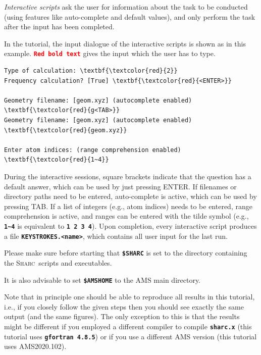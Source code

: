 \documentclass[a4paper,11pt,DIV=15,openany]{scrbook}
\newcommand{\sharc}{\textsc{Sharc}}
\newcommand{\ttt}[1]{\textbf{\texttt{#1}}}
\begin{document}
\emph{Interactive scripts} ask the user for information about the task to be conducted (using features like auto-complete and default values), and only perform the task after the input has been completed. 

In the tutorial, the input dialogue of the interactive scripts is shown as in this example. 
\texttt{\textbf{\textcolor{red}{Red bold text}}} gives the input which the user has to type. 
\begin{oframed}
\footnotesize\begin{Verbatim}[commandchars=\\\{\}]
Type of calculation: \textbf{\textcolor{red}{2}}
Frequency calculation? [True] \textbf{\textcolor{red}{<ENTER>}}

Geometry filename: [geom.xyz] (autocomplete enabled) \textbf{\textcolor{red}{g<TAB>}}
Geometry filename: [geom.xyz] (autocomplete enabled) \textbf{\textcolor{red}{geom.xyz}}

Enter atom indices: (range comprehension enabled) \textbf{\textcolor{red}{1~4}}
\end{Verbatim}
\end{oframed}

\normalsize
During the interactive sessions, square brackets indicate that the question has a default answer, which can be used by just pressing ENTER. 
If filenames or directory paths need to be entered, auto-complete is active, which can be used by pressing TAB. 
If a list of integers (e.g., atom indices) needs to be entered, range comprehension is active, and ranges can be entered with the tilde symbol (e.g., \ttt{1\textasciitilde 4} is equivalent to \ttt{1 2 3 4}).
Upon completion, every interactive script produces a file \ttt{KEYSTROKES.<name>}, which contains all user input for the last run.

\begin{shaded}
  Please make sure before starting that \ttt{\$SHARC} is set to the directory containing the \sharc\ scripts and executables.

  It is also advisable to set \ttt{\$AMSHOME} to the \textsc{AMS} main directory.
\end{shaded}

Note that in principle one should be able to reproduce all results in this tutorial, i.e., if you closely follow the given steps then you should see exactly the same output (and the same figures).
The only exception to this is that the results might be different if you employed a different compiler to compile \ttt{sharc.x} (this tutorial uses \ttt{gfortran 4.8.5}) or if you use a different \textsc{AMS} version (this tutorial uses \textsc{AMS2020.102}).
\end{document}
